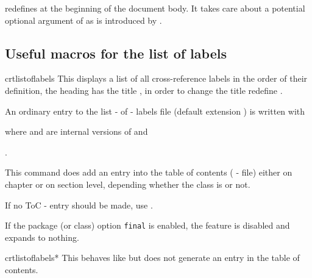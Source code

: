 \documentclass[12pt,a4paper,oneside]{article}
\makeatletter
\newcommand{\chdocextractversion}[1]{%
  \@nameuse{#1}%
}
\makeatother
\begin{document}
\begin{marker}
   redefines  at the beginning of the document body. It takes care about a potential optional argument of  as is introduced by . 
\end{marker}


\subsection{Useful macros for the list of labels}




\begin{docCommand}[doc new={\chdocextractversion{crossreftoolsversion0.4}}]{crtlistoflabels}{}
This displays a list of all cross-reference labels in the order of their definition, the heading has the title \texttt{\listoflabelsname}, in order to change the title redefine . 

An ordinary entry to the list - of - labels file (default extension ) is written with  


where  and  are internal versions of  and

.

This command does add an entry into the table of contents ( - file) either on chapter or on section level, depending whether the class is  or not. 

If no ToC - entry should be made, use .

\begin{marker}
  If the package (or class) option \texttt{final} is enabled, the  feature is disabled and  expands to nothing. 
\end{marker}


\end{docCommand}


\begin{docCommand}[doc new={\chdocextractversion{crossreftoolsversion0.4}}]{crtlistoflabels*}{}
This behaves like  but does not generate an entry in the table of contents. 

\end{docCommand}
\end{document}
